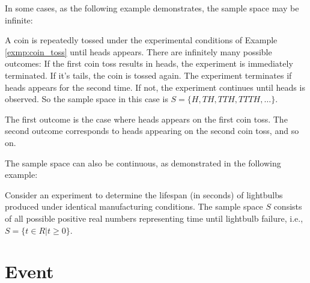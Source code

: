 In some cases, as the following example demonstrates, the sample space may be infinite:

\begin{exmp}\label{exmp:heads_observe}
	A coin is repeatedly tossed under the experimental conditions of Example \autoref{exmp:coin_toss} until heads appears.
	There are infinitely many possible outcomes:
	If the first coin toss results in heads, the experiment is immediately terminated.
	If it's tails, the coin is tossed again.
	The experiment terminates if heads appears for the second time.
	If not, the experiment continues until heads is observed.
	So the sample space in this case is \( S = \{ H, TH, TTH, TTTH, \ldots \} \).

	The first outcome is the case where heads appears on the first coin toss.
	The second outcome corresponds to heads appearing on the second coin toss, and so on.
\end{exmp}

The sample space can also be continuous, as demonstrated in the following example:

\begin{exmp}\label{exmp:lightbulb_lifespan}
	Consider an experiment to determine the lifespan (in seconds) of lightbulbs produced under identical manufacturing conditions.
	The sample space \( S \) consists of all possible positive real numbers representing time until lightbulb failure, i.e., \( S = \{ t \in R | t \geq 0 \} \).
\end{exmp}

\section{Event}

